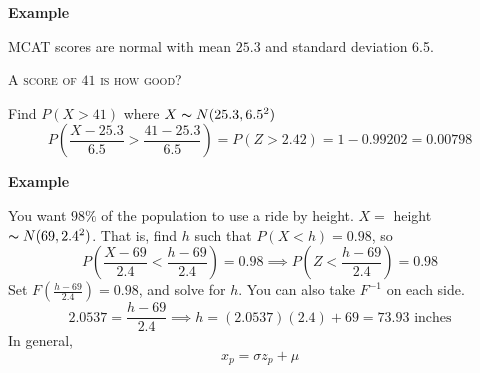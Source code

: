 \textbf{Example}

MCAT scores are normal with mean $ 25.3 $ and standard deviation 6.5.

\textsc{A score of $ 41 $ is how good?}

Find $ P(X>41) $ where $ X \thicksim N(25.3,6.5^2) $
\[ P\left(\frac{X-25.3}{6.5}>\frac{41-25.3}{6.5}\right)=P(Z>2.42)=1-0.99202=0.00798 \]

\textbf{Example}

You want $ 98\% $ of the population to use a ride by height.
$ X= $ height $ \thicksim N(69,2.4^2) $. That is, find $ h $
such that $ P(X<h)=0.98 $, so
\[ P\left(\frac{X-69}{2.4}<\frac{h-69}{2.4}\right)=0.98\implies P\left(Z<\frac{h-69}{2.4}\right)=0.98\]
Set $F(\frac{h-69}{2.4})=0.98 $, and solve for $ h $. You can also take $ F^{-1} $ on each side.
\[ 2.0537=\frac{h-69}{2.4}\implies h=(2.0537)(2.4)+69=73.93\text{ inches} \]
In general,
\[ x_p=\sigma z_p+\mu \]
